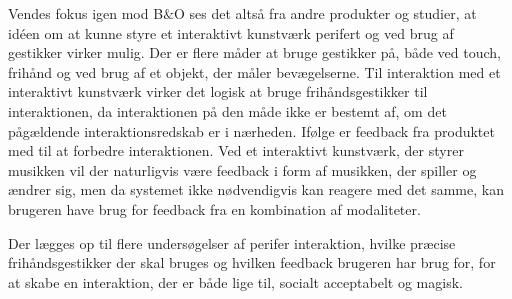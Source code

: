 Vendes fokus igen mod B$\&$O ses det altså fra andre produkter og studier, at idéen om at kunne styre et interaktivt kunstværk perifert og ved brug af gestikker virker mulig. Der er flere måder at bruge gestikker på, både ved touch, frihånd og ved brug af et objekt, der måler bevægelserne. Til interaktion med et interaktivt kunstværk virker det logisk at bruge frihåndsgestikker til interaktionen, da interaktionen på den måde ikke er bestemt af, om det pågældende interaktionsredskab er i nærheden. Ifølge \textcite[s. 21]{PDF:FacilitatingPIDesignAndEvaluation} er feedback fra produktet med til at forbedre interaktionen. Ved et interaktivt kunstværk, der styrer musikken vil der naturligvis være feedback i form af musikken, der spiller og ændrer sig, men da systemet ikke nødvendigvis kan reagere med det samme, kan brugeren have brug for feedback fra en kombination af modaliteter. 

Der lægges op til flere undersøgelser af perifer interaktion, hvilke præcise frihåndsgestikker der skal bruges og hvilken feedback brugeren har brug for, for at skabe en interaktion, der er både lige til, socialt acceptabelt og magisk.

